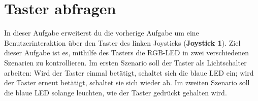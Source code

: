 \section{\ExercisePrefixEmbeddedC Taster abfragen \optional}

\optionaltextboxC

In dieser Aufgabe erweiterst du die vorherige Aufgabe um eine Benutzerinteraktion über den Taster des linken Joysticks (\textbf{Joystick 1}).
Ziel dieser Aufgabe ist es, mithilfe des Tasters die RGB-LED in zwei verschiedenen Szenarien zu kontrollieren.
Im ersten Szenario soll der Taster als Lichtschalter arbeiten: Wird der Taster einmal betätigt, schaltet sich die blaue LED ein; wird der Taster erneut betätigt, schaltet sie sich wieder ab.
Im zweiten Szenario soll die blaue LED solange leuchten, wie der Taster gedrückt gehalten wird.

